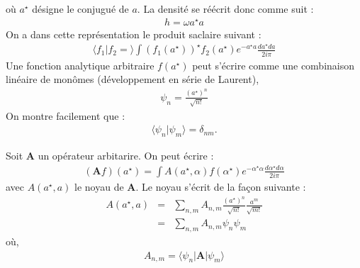 \documentclass[a4paper,11pt]{article} %
\theoremstyle{plain}
\theoremstyle{definition}
\theoremstyle{remark}
\numberwithin{equation}{section}
\numberwithin{equation}{subsection}
\numberwithin{figure}{section}
\begin{document}
où $a^{\star}$ désigne le conjugué de $a$. La densité se réécrit donc comme suit :
\begin{eqnarray*}
 h = \omega a^{\star} a
\end{eqnarray*}
On a dans cette représentation le produit saclaire suivant :
\begin{eqnarray*}
 \langle f_{1} | f_{2} = \rangle \int \left(f_{1} (a^{\star})\right)^{\star} f_{2} (a^{\star}) e^{- a^{\star} a } \frac{da^{\star} da}{2i \pi}
\end{eqnarray*}
Une fonction analytique arbitraire $f (a^{\star})$ peut s'écrire comme une combinaison linéaire de monômes (développement en série de Laurent),
\begin{eqnarray*}
 \psi_{n} = \frac{(a^{\star})^n}{\sqrt{n !}}
\end{eqnarray*}
On montre facilement que : 
\begin{eqnarray*}
 \langle \psi_{n} | \psi_{m} \rangle = \delta_{nm}.
\end{eqnarray*}

\noindent
Soit \textbf{A} un opérateur arbitarire. On peut écrire :\\
\begin{eqnarray*}
 (\textbf{A}f)(a^{\star}) = \int A(a^\star,\alpha) f(\alpha^{\star}) e^{-\alpha^{\star} \alpha } \frac{d\alpha^{\star} d\alpha}{2i \pi}
\end{eqnarray*}
avec $ A(a^\star,a) $  le noyau de \textbf{A}. Le noyau s'écrit de la façon suivante :
\begin{eqnarray*}
 A(a^{\star},a) &=& \sum_{n,m} A_{n,m} \frac{ (a^{\star})^{n} }{ \sqrt{n !} } \frac{a^{m}}{\sqrt{m!}}\\
                &=&  \sum_{n,m} A_{n,m} \psi_{n} \psi_{m}
\end{eqnarray*}
où,
\begin{eqnarray*}
 A_{n,m} = \langle \psi_{n} | \textbf{A} | \psi_{m} \rangle
\end{eqnarray*}
\end{document}
